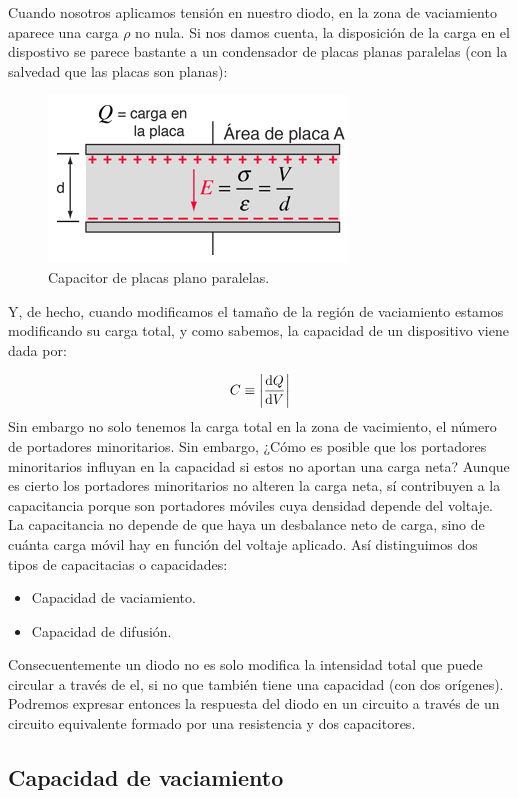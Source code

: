 Cuando nosotros aplicamos tensión en nuestro diodo, en la zona de vaciamiento aparece una carga $\rho$ no nula. Si nos damos cuenta, la disposición de la carga en el dispostivo se parece bastante a un condensador de placas planas paralelas (con la salvedad que las placas son planas):

\begin{figure}[h!] \centering
    \includegraphics[width=0.45\linewidth]{Cuerpo/Ch_03/03_Temario_07.png}
    \caption{Capacitor de placas plano paralelas.}
\end{figure}
Y, de hecho, cuando modificamos el tamaño de la región de vaciamiento estamos modificando su carga total, y como sabemos, la capacidad de un dispositivo viene dada por: 

\begin{equation}
    C \equiv \abs{\frac{\mathrm{d} Q}{\mathrm{d} V}}
\end{equation}
Sin embargo no solo tenemos la carga total en la zona de vacimiento, el número de portadores minoritarios. Sin embargo, ¿Cómo es posible que los portadores minoritarios influyan en la capacidad si estos no aportan una carga neta? Aunque es cierto los portadores minoritarios no alteren la carga neta, sí contribuyen a la capacitancia porque son portadores móviles cuya densidad depende del voltaje. La capacitancia no depende de que haya un desbalance neto de carga, sino de cuánta carga móvil hay en función del voltaje aplicado. Así distinguimos dos tipos de capacitacias o capacidades: 

\begin{itemize}
    \item Capacidad de vaciamiento.
    \item Capacidad de difusión.
\end{itemize}
Consecuentemente un diodo no es solo modifica la intensidad total que puede circular a través de el, si no que también tiene una capacidad (con dos orígenes). Podremos expresar entonces la respuesta del diodo en un circuito a través de un circuito equivalente formado por una resistencia y dos capacitores. 

\subsection{Capacidad de vaciamiento}

